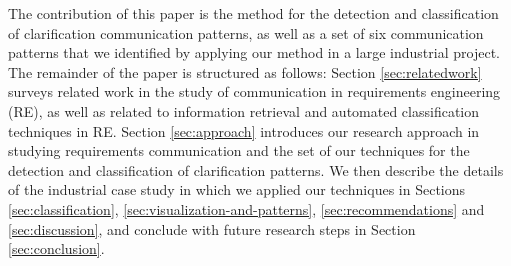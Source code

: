 The contribution of this paper is the method for the detection and classification of clarification communication patterns, as well as a set of six communication patterns that we identified by applying our method in a large industrial project. The remainder of the paper is structured as follows: Section \ref{sec:relatedwork} surveys related work in the study of communication in requirements engineering (RE), as well as related to information retrieval and automated classification techniques in RE. 
Section \ref{sec:approach} introduces our research approach in studying requirements communication and the set of our techniques for the detection and classification of clarification  patterns. 
We then describe the details of the industrial case study in which we applied our techniques in Sections \ref{sec:classification}, \ref{sec:visualization-and-patterns}, \ref{sec:recommendations} and \ref{sec:discussion}, and 
 conclude with future research steps in Section \ref{sec:conclusion}.





